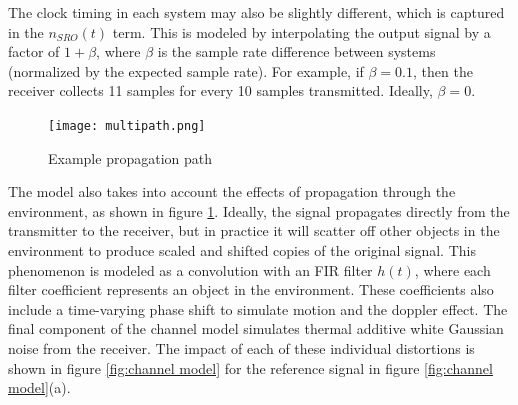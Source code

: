 \documentclass{article}
\begin{document}
The clock timing in each system may also be slightly different, which is
captured in the $n_{SRO}(t)$ term. This is modeled by interpolating the output
signal by a factor of $1 + \beta$, where $\beta$ is the sample rate difference
between systems (normalized by the expected sample rate). For example, if
$\beta = 0.1$, then the receiver collects 11 samples for every 10 samples
transmitted. Ideally, $\beta = 0$.

\begin{figure}[H]
    \centering
    \texttt{[image: multipath.png]}
    \caption{Example propagation path}
    \label{fig:multipath}
\end{figure}
The model also takes into account the effects of propagation through the
environment, as shown in figure \ref{fig:multipath}.
Ideally, the signal propagates directly from the transmitter to the receiver,
but in practice it will scatter off other objects in the environment to produce
scaled and shifted copies of the original signal. This phenomenon is modeled as
a convolution with an FIR filter $h(t)$, where each filter coefficient
represents an object in the environment. These coefficients also include a
time-varying phase shift to simulate motion and the doppler effect. The final
component of the channel model simulates thermal additive white Gaussian noise
from the receiver. The impact of each of these individual distortions is shown
in figure \ref{fig:channel model} for the reference signal in figure \ref{fig:channel model}(a).
\end{document}
